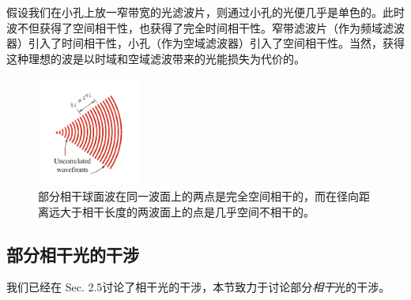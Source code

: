 \documentclass[UTF8]{ctexart}
\numberwithin{figure}{subsection}
\numberwithin{table}{subsection}
\begin{document}
\par 假设我们在小孔上放一窄带宽的光滤波片，则通过小孔的光便几乎是单色的。此时波不但获得了空间相干性，也获得了完全时间相干性。窄带滤波片（作为频域滤波器）引入了时间相干性，小孔（作为空域滤波器）引入了空间相干性。当然，获得这种理想的波是以时域和空域滤波带来的光能损失为代价的。
 \begin{figure}[H]
\centering
\includegraphics[width=0.3\textwidth]{11_1_10.PNG}
\caption{部分相干球面波在同一波面上的两点是完全空间相干的，而在径向距离远大于相干长度的两波面上的点是几乎空间不相干的。}
\label{fig: 11_1_10}
\end{figure}

\bigbreak\begingroup
\color{ksc}
\subsection{部分相干光的干涉}
\endgroup
我们已经在 Sec. 2.5讨论了相干光的干涉，本节致力于讨论部分\textsl{相干}光的干涉。
\bigbreak\begingroup
\color{ksc}
\end{document}
